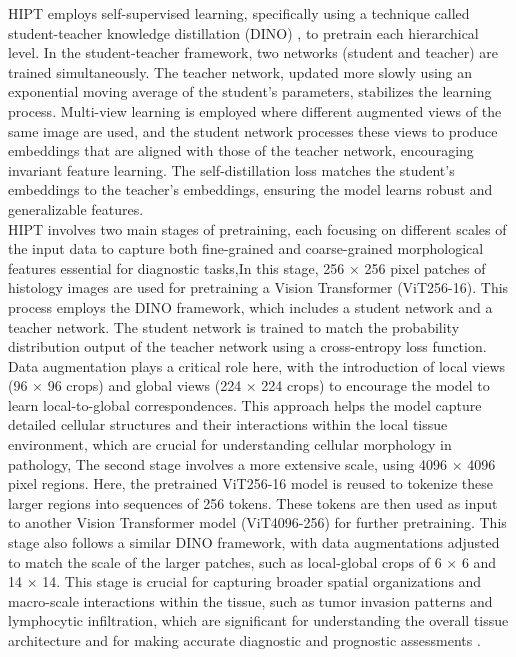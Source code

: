 \documentclass[
11pt, %
english, %
singlespacing, %
headsepline, %
]{project_structure}
\newcommand{\subpar}[1]{\paragraph*{#1}}
\begin{document}
\noindent \acrshort{HIPT} employs self-supervised learning, specifically using a technique called student-teacher knowledge distillation (\acrshort{DINO}) \cite{DINO}, to pretrain each hierarchical level. In the student-teacher framework, two networks (student and teacher) are trained simultaneously. The teacher network, updated more slowly using an exponential moving average of the student's parameters, stabilizes the learning process. Multi-view learning is employed where different augmented views of the same image are used, and the student network processes these views to produce embeddings that are aligned with those of the teacher network, encouraging invariant feature learning. The self-distillation loss matches the student’s embeddings to the teacher’s embeddings, ensuring the model learns robust and generalizable features.\\


\noindent \acrshort{HIPT} involves two main stages of pretraining, each focusing on different scales of the input data to capture both fine-grained and coarse-grained morphological features essential for diagnostic tasks,In this stage, 256 × 256 pixel patches of histology images are used for pretraining a Vision Transformer (ViT256-16). This process employs the \acrshort{DINO} framework, which includes a student network and a teacher network. The student network is trained to match the probability distribution output of the teacher network using a cross-entropy loss function. Data augmentation plays a critical role here, with the introduction of local views (96 × 96 crops) and global views (224 × 224 crops) to encourage the model to learn local-to-global correspondences. This approach helps the model capture detailed cellular structures and their interactions within the local tissue environment, which are crucial for understanding cellular morphology in pathology, The second stage involves a more extensive scale, using 4096 × 4096 pixel regions. Here, the pretrained ViT256-16 model is reused to tokenize these larger regions into sequences of 256 tokens. These tokens are then used as input to another Vision Transformer model (ViT4096-256) for further pretraining. This stage also follows a similar \acrshort{DINO} framework, with data augmentations adjusted to match the scale of the larger patches, such as local-global crops of 6 × 6 and 14 × 14. This stage is crucial for capturing broader spatial organizations and macro-scale interactions within the tissue, such as tumor invasion patterns and lymphocytic infiltration, which are significant for understanding the overall tissue architecture and for making accurate diagnostic and prognostic assessments .
\end{document}
